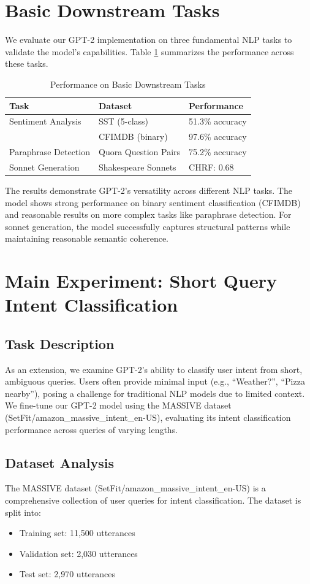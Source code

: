 \documentclass{article}
\begin{document}
\section{Basic Downstream Tasks}
We evaluate our GPT-2 implementation on three fundamental NLP tasks to validate the model's capabilities. Table \ref{tab:downstream_results} summarizes the performance across these tasks.

\begin{table}[h]
\centering
\begin{tabular}{lll}
\toprule
\textbf{Task} & \textbf{Dataset} & \textbf{Performance} \\
\midrule
Sentiment Analysis & SST (5-class) & 51.3\% accuracy \\
& CFIMDB (binary) & 97.6\% accuracy \\
\midrule
Paraphrase Detection & Quora Question Pairs & 75.2\% accuracy \\
\midrule
Sonnet Generation & Shakespeare Sonnets & CHRF: 0.68 \\
\bottomrule
\end{tabular}
\caption{Performance on Basic Downstream Tasks}
\label{tab:downstream_results}
\end{table}

The results demonstrate GPT-2's versatility across different NLP tasks. The model shows strong performance on binary sentiment classification (CFIMDB) and reasonable results on more complex tasks like paraphrase detection. For sonnet generation, the model successfully captures structural patterns while maintaining reasonable semantic coherence.

\section{Main Experiment: Short Query Intent Classification}
\subsection{Task Description}
As an extension, we examine GPT-2's ability to classify user intent from short, ambiguous queries. Users often provide minimal input (e.g., ``Weather?'', ``Pizza nearby''), posing a challenge for traditional NLP models due to limited context. We fine-tune our GPT-2 model using the MASSIVE dataset (SetFit/amazon\_massive\_intent\_en-US), evaluating its intent classification performance across queries of varying lengths.

\subsection{Dataset Analysis}
The MASSIVE dataset (SetFit/amazon\_massive\_intent\_en-US) is a comprehensive collection of user queries for intent classification. The dataset is split into:
\begin{itemize}
    \item Training set: 11,500 utterances
    \item Validation set: 2,030 utterances
    \item Test set: 2,970 utterances
\end{itemize}
\end{document}
